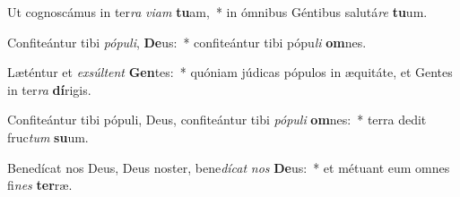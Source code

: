 \item Ut cognoscámus in ter\textit{ra} \textit{vi}\textit{am} \textbf{tu}am,~* in ómnibus Géntibus salutá\textit{re} \textbf{tu}um.
\item Confiteántur tibi \textit{pó}\textit{pu}\textit{li}, \textbf{De}us:~* confiteántur tibi pópu\textit{li} \textbf{om}nes.
\item Læténtur et \textit{ex}\textit{súl}\textit{tent} \textbf{Gen}tes:~* quóniam júdicas pópulos in æquitáte, et Gentes in ter\textit{ra} \textbf{dí}rigis.
\item Confiteántur tibi pópuli, Deus, confiteántur tibi \textit{pó}\textit{pu}\textit{li} \textbf{om}nes:~* terra dedit fruc\textit{tum} \textbf{su}um.
\item Benedícat nos Deus, Deus noster, bene\textit{dí}\textit{cat} \textit{nos} \textbf{De}us:~* et métuant eum omnes fi\textit{nes} \textbf{ter}ræ.
